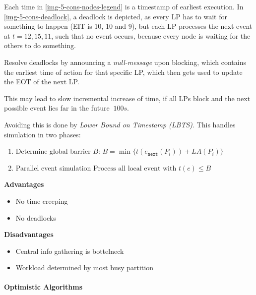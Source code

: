 \documentclass[english]{panikzettel}
\begin{document}
	Each time in \cref{img-5-cons-nodes-legend} is a timestamp of earliest execution.
	In \cref{img-5-cons-deadlock}, a deadlock is depicted, as every LP has to wait for something to happen (EIT is 10, 10 and 9), but each LP processes the next event at \( t = 12, 15, 11 \), such that no event occurs, because every node is waiting for the others to do something. 

	Resolve deadlocks by announcing a \textit{null-message} upon blocking, which contains the earliest time of action for that specific LP, which then gets used to update the EOT of the next LP.

	This may lead to slow incremental increase of time, if all LPs block and the next possible event lies far in the future \(~100 s \).

	Avoiding this is done by \textit{Lower Bound on Timestamp (LBTS)}. 
	This handles simulation in two phases:
	\begin{enumerate}
		\item Determine global barrier \( B \): 
			\(
				B = \min\{t(e_\texttt{next}( P_{i})) + LA(P_{i})\}
			\)
		\item	 Parallel event simulation
			\(
				\text{Process all local event with } t(e) \leq B
			\)
	\end{enumerate}
	
	\begin{halfboxl}
		\textbf{Advantages} 
		\begin{itemize}
			\item No time creeping
			\item No deadlocks
		\end{itemize}
	\end{halfboxl}%
	\begin{halfboxr}
		\vspace{-\baselineskip}
		\textbf{Disadvantages} 
		\begin{itemize}
			\item Central info gathering is bottelneck
			\item Workload determined by most busy partition
		\end{itemize}
	\end{halfboxr}

	\paragraph{Optimistic Algorithms}
	\label{pgf:synchronization-and-coordination-algorithms:optimistic-algorithms}
	
\end{document}
